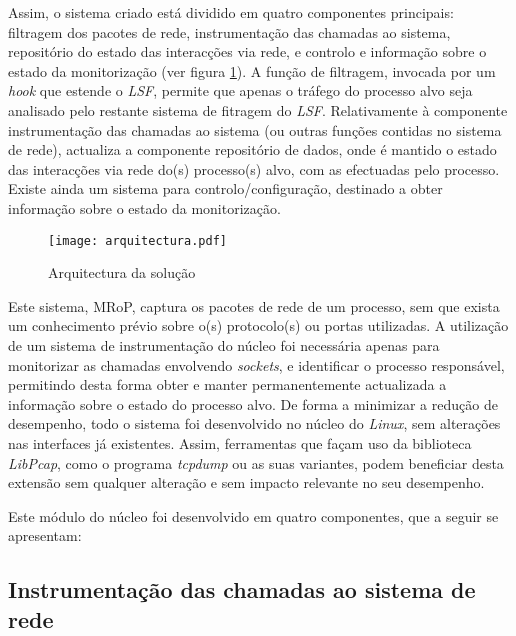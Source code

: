 Assim, o sistema criado está dividido em quatro componentes principais: filtragem dos pacotes de rede, instrumentação das chamadas ao sistema, repositório do estado das interacções via rede, e controlo e informação sobre o estado da monitorização (ver figura \ref{arquitectura}).
A função de filtragem, invocada por um \textit{hook} que estende o \textit{LSF}, permite que apenas o tráfego do processo alvo seja analisado pelo restante sistema de fitragem do \textit{LSF}.
Relativamente à componente instrumentação das chamadas ao sistema (ou outras funções contidas no sistema de rede), actualiza a componente repositório de dados, onde é mantido o estado das interacções via rede do(s) processo(s) alvo, com as efectuadas pelo processo.
Existe ainda um sistema para controlo/configuração, destinado a obter informação sobre o estado da monitorização.

\begin{figure}[htbp]
\begin{center}
\texttt{[image: arquitectura.pdf]} 
\caption{Arquitectura da solução}
\label{arquitectura}
\end{center}
\end{figure}

Este sistema, MRoP, captura os pacotes de rede de um processo, sem que exista um conhecimento prévio sobre o(s) protocolo(s) ou portas utilizadas.
A utilização de um sistema de instrumentação do núcleo foi necessária apenas para monitorizar as chamadas envolvendo \emph{sockets}, e identificar o processo responsável, permitindo desta forma obter e manter permanentemente actualizada a informação sobre o estado do processo alvo.
De forma a minimizar a redução de desempenho, todo o sistema foi desenvolvido no núcleo do \textit{Linux}, sem alterações nas interfaces já existentes.
Assim, ferramentas que façam uso da biblioteca \textit{LibPcap}, como o programa \textit{tcpdump} ou as suas variantes, podem beneficiar desta extensão sem qualquer alteração e sem impacto relevante no seu desempenho.

Este módulo do núcleo foi desenvolvido em quatro componentes, que a seguir se apresentam:


\subsection{Instrumentação das chamadas ao sistema de rede}
\label{sub:mon_syscalls}

